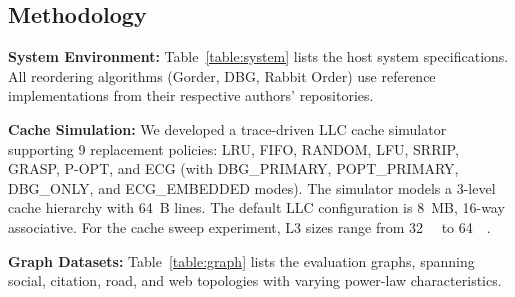 \documentclass[conference]{IEEEtran}
\begin{document}
\subsection{Methodology}

\textbf{System Environment:} Table~\ref{table:system} lists the host system specifications. All reordering algorithms (Gorder, DBG, Rabbit Order) use reference implementations from their respective authors' repositories.

\begin{scriptsize}
\begin{table}[t]
\centering
\caption{System environment for ECG evaluation}
\label{table:system}
\end{table}
\end{scriptsize}

\textbf{Cache Simulation:} We developed a trace-driven LLC cache simulator supporting 9 replacement policies: LRU, FIFO, RANDOM, LFU, SRRIP, GRASP, P-OPT, and ECG (with DBG\_PRIMARY, POPT\_PRIMARY, DBG\_ONLY, and ECG\_EMBEDDED modes). The simulator models a 3-level cache hierarchy with 64~B lines. The default LLC configuration is 8~MB, 16-way associative. For the cache sweep experiment, L3 sizes range from \SI{32}{\kilo\byte} to \SI{64}{\mega\byte}.

\textbf{Graph Datasets:} Table~\ref{table:graph} lists the evaluation graphs, spanning social, citation, road, and web topologies with varying power-law characteristics.
\end{document}

